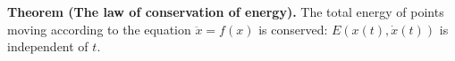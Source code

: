 \textbf{Theorem (The law of conservation of energy).} The total energy of points moving according to the equation $\ddot{x} = f(x)$ is conserved: $E(x(t), \dot{x}(t))$ is independent of $t$.
